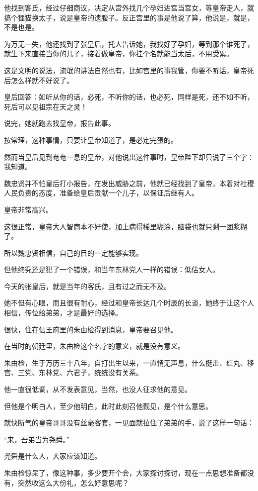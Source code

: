 \begin{multicols}{\theparacolNo}
		他找到客氏，经过仔细商议，决定从宫外找几个孕妇进宫当宫女，等皇帝走人，就搞个狸猫换太子，说是皇帝的遗腹子。反正宫里的事是他说了算，他说是，就是，不是也是。

		为万无一失，他还找到了张皇后，托人告诉她，我找好了孕妇，等到那个谁死了，就生下来直接当你的儿子，接着做皇帝，你挂个名就能当太后，不用受累。

		这是文明的说法，流氓的讲法自然也有，比如宫里的事我管，你要不听话，皇帝死后怎么样就不好说了。

		皇后回答：如听从你的话，必死，不听你的话，也必死，同样是死，还不如不听，死后可以见祖宗在天之灵！

		说完，她就跑去找皇帝，报告此事。

		按常理，这种事情，只要让皇帝知道了，是必定完蛋的。

		然而当皇后见到奄奄一息的皇帝，对他说出这件事时，皇帝陛下却只说了三个字：我知道。

		魏忠贤并不怕皇后打小报告，在发出威胁之前，他就已经找到了皇帝，本着对社稷人民负责的态度，准备给皇后贡献一个儿子，以保证后继有人。

		皇帝非常高兴。

		这很正常，皇帝大人智商本不好使，加上病得稀里糊涂，脑袋也就只剩一团浆糊了。

		所以魏忠贤相信，自己的目的一定能够实现。

		但他终究还是犯了一个错误，和当年东林党人一样的错误：低估女人。

		今天的张皇后，就是当年的客氏，且有过之而无不及。

		她不但有心眼，而且很有耐心，经过和皇帝长达几个时辰的长谈，她终于让这个人相信，传位给弟弟，才是最好的选择。

		很快，住在信王府里的朱由检得到消息，皇帝要召见他。

		在当时的朝廷里，朱由检这个名字的意义，就是没有意义。

		朱由检，生于万历三十八年，自打出生以来，一直悄无声息，什么梃击、红丸、移宫、三党、东林党、六君子，统统没有关系。

		他一直很低调，从不发表意见，当然，也没人征求他的意见。

		但他是个明白人，至少他明白，此时此刻召他觐见，是个什么意思。

		就快断气的皇帝哥哥没有丝毫客套，一见面就拉住了弟弟的手，说了这样一句话：

		“来，吾弟当为尧舜。”

		尧舜是什么人，大家应该知道。

		朱由检惊呆了，像这种事，多少要开个会，大家探讨探讨，现在一点思想准备都没有，突然收这么大份礼，怎么好意思呢？


\end{multicols}
